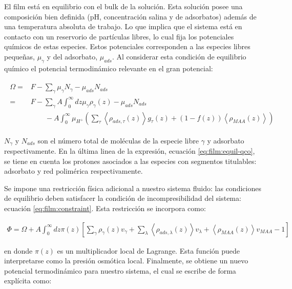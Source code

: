 El film est\'a en equilibrio con el bulk de la soluci\'on. Esta soluci\'on posee una composici\'on bien definida (pH, concentraci\'on salina y de adsorbatos) adem\'as de una temperatura absoluta de trabajo. Lo que implica que el sistema est\'a en contacto con un reservorio de part\'iculas libres, lo cual fija los potenciales qu\'imicos de estas especies. Estos potenciales corresponden a las especies libres peque\~nas, $\mu_\gamma$ y del adsorbato, $\mu_{ads}$. Al considerar esta condici\'on de equilibrio qu\'imico el potencial termodin\'amico relevante en el gran potencial: 

\begin{align}
	\begin{aligned}
		\Omega = &F - \sum_\gamma \mu_\gamma N_\gamma -  \mu_{ads} N_{ads} \\
			= &F -\sum_\gamma A\int_0^\infty dz \mu_\gamma \rho_\gamma(z) -  \mu_{ads} N_{ads}  \\
			& \qquad -A\int_0^\infty \mu_{H^+} \left( \sum_\tau\left< \rho_{ads,\tau}(z) \right>g_\tau(z) + (1-f(z))\left< \rho_{MAA}(z) \right> \right )
			\end{aligned}
		\label{eq:film:equil-qco}
\end{align}

\noindent $N_\gamma$ y $ N_{ads}$ son el n\'umero total de mol\'eculas de la especie libre $\gamma$ y adsorbato respectivamente. En la \'ultima linea de la expresi\'on, ecuaci\'on \ref{eq:film:equil-qco}, se tiene en cuenta los protones asociados a las especies con segmentos titulables: adsorbato y red polim\'erica respectivamente.


Se impone una restricci\'on f\'isica adicional a nuestro sistema fluido: las condiciones de equilibrio deben satisfacer la condici\'on de incompresibilidad del sistema: ecuaci\'on \ref{eq:film:constraint}.  Esta restricci\'on se incorpora como:

\begin{align}
	\Phi = \Omega +A \int_0^\infty dz\pi(z){\left[\sum_{\gamma}\rho_\gamma(z) v_\gamma + \sum_\lambda{\left<\rho_{ads,\lambda}(z)\right>v_\lambda} + \left<\rho_{MAA}(z)\right>v_{MAA} -1 \right]}
\end{align}


\noindent en donde $\pi(z)$ es un multiplicador local de Lagrange.  Esta funci\'on puede interpretarse como la presi\'on osm\'otica local. Finalmente, se obtiene un nuevo potencial termodin\'amico para nuestro sistema, el cual se escribe de forma expl\'icita como:
 
